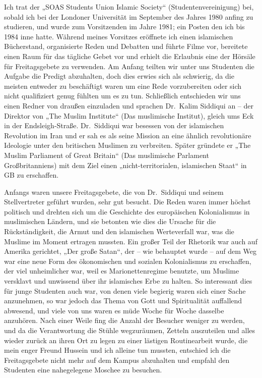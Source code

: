 \documentclass[12pt]{memoir}
\def\–{\hskip0pt-\hskip0pt}
\begin{document}
Ich trat der „SOAS Students Union Islamic Society“ (Studentenvereinigung) bei,
sobald ich bei der Londoner Universität
im September des Jahres 1980 anfing zu studieren,
und wurde zum Vorsitzenden im Jahre 1981;
ein Posten den ich bis 1984 inne hatte.
Während meines Vorsitzes eröffnete ich einen islamischen Bücherstand,
organisierte Reden und Debatten und führte Filme vor,
bereitete einen Raum für das tägliche Gebet vor
und erhielt die Erlaubnis eine der Hörsäle für Freitagsgebete zu verwenden.
Am Anfang teilten wir unter uns Studenten die Aufgabe die Predigt abzuhalten,
doch dies erwies sich als schwierig,
da die meisten entweder zu beschäftigt waren um eine Rede vorzubereiten
oder sich nicht qualifiziert genug fühlten um es zu tun.
Schließlich entschieden wir uns einen Redner von draußen einzuladen
und sprachen Dr.\ Kalim Siddiqui an –
der Direktor von „The Muslim Institute“ (Das muslimische Institut),
gleich ums Eck in der Endsleigh-Straße.
Dr.\ Siddiqui war besessen von der islamischen Revolution im Iran
und er sah es als seine Mission an eine ähnlich revolutionäre Ideologie
unter den britischen Muslimen zu verbreiten.
Später gründete er „The Muslim Parliament of Great Britain“
(Das muslimische Parlament Großbritanniens) mit dem Ziel
einen „nicht\–territorialen, islamischen Staat“ in GB zu erschaffen.

Anfangs waren unsere Freitagsgebete,
die von Dr.\ Siddiqui und seinem Stellvertreter geführt wurden,
sehr gut besucht.
Die Reden waren immer höchst politisch und drehten sich
um die Geschichte des europäischen Kolonialismus in muslimischen Ländern,
und sie betonten wie dies die Ursache für die Rückständigkeit,
die Armut und den islamischen Werteverfall war,
was die Muslime im Moment ertragen mussten.
Ein großer Teil der Rhetorik war auch auf Amerika gerichtet,
„Der große Satan“, der – wie behauptet wurde –
auf dem Weg war eine neue Form des ökonomischen
und sozialen Kolonialismus zu erschaffen, der viel unheimlicher war,
weil es Marionettenregime benutzte,
um Muslime versklavt und unwissend über ihr islamisches Erbe zu halten.
So interessant dies für junge Studenten auch war,
von denen viele begierig waren sich einer Sache anzunehmen,
so war jedoch das Thema von Gott und Spiritualität auffallend abwesend,
und viele von uns waren es müde Woche für Woche dasselbe anzuhören.
Nach einer Weile fing die Anzahl der Besucher weniger zu werden,
und da die Verantwortung die Stühle wegzuräumen,
Zetteln auszuteilen und alles wieder zurück an ihren Ort zu legen
zu einer lästigen Routinearbeit wurde,
die mein enger Freund Hussein und ich alleine tun mussten,
entschied ich die Freitagsgebete nicht mehr auf dem Kampus abzuhalten
und empfahl den Studenten eine nahegelegene Moschee zu besuchen.
\end{document}
